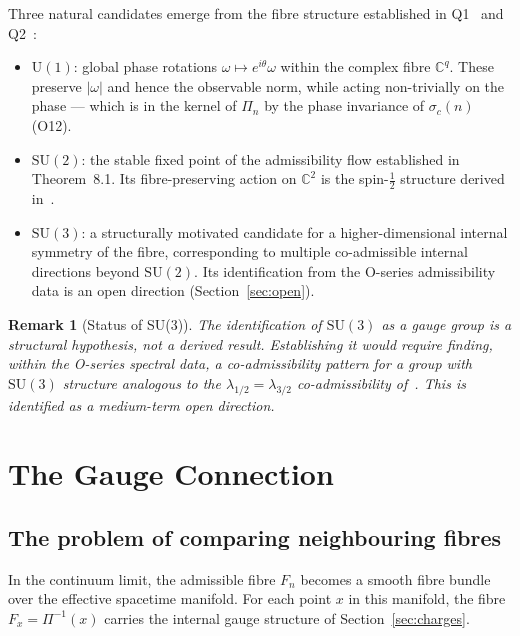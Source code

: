 \documentclass[11pt,a4paper]{article}
\newtheorem{remark}[theorem]{Remark}
\begin{document}
      Three natural candidates emerge from the fibre structure established in
      Q1~\cite{Q1} and Q2~\cite{Q2}:

      \begin{itemize}
        \item \emph{$\mathrm{U}(1)$}: global phase rotations $\omega \mapsto e^{i\theta}\omega$
        within the complex fibre $\mathbb{C}^q$.
        These preserve $|\omega|$ and hence the observable norm, while acting
        non-trivially on the phase — which is in the kernel of $\Pi_n$ by the
        phase invariance of $\sigma_c(n)$ (O12).
        \item \emph{$\mathrm{SU}(2)$}: the stable fixed point of the admissibility flow
        established in~\cite{Q2} Theorem~8.1.
        Its fibre-preserving action on $\mathbb{C}^2$ is the spin-$\tfrac{1}{2}$
        structure derived in~\cite{Q1}.
        \item \emph{$\mathrm{SU}(3)$}: a structurally motivated candidate for a
        higher-dimensional internal symmetry of the fibre, corresponding to
        multiple co-admissible internal directions beyond $\mathrm{SU}(2)$.
        Its identification from the O-series admissibility data is an open direction
        (Section~\ref{sec:open}).
      \end{itemize}

      \begin{remark}[Status of SU(3)]
        The identification of $\mathrm{SU}(3)$ as a gauge group is a structural
        hypothesis, not a derived result.
        Establishing it would require finding, within the O-series spectral data,
        a co-admissibility pattern for a group with $\mathrm{SU}(3)$ structure
        analogous to the $\lambda_{1/2} = \lambda_{3/2}$ co-admissibility of~\cite{Q2}.
        This is identified as a medium-term open direction.
      \end{remark}

  \section{The Gauge Connection}
    \label{sec:connection}

    \subsection{The problem of comparing neighbouring fibres}

      In the continuum limit, the admissible fibre $F_n$ becomes a smooth fibre
      bundle over the effective spacetime manifold.
      For each point $x$ in this manifold, the fibre $F_x = \Pi^{-1}(x)$ carries
      the internal gauge structure of Section~\ref{sec:charges}.
\end{document}

